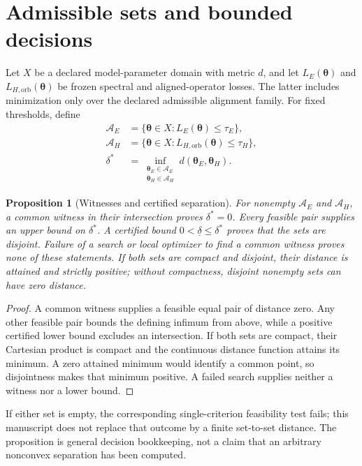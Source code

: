 \documentclass[11pt]{article}
\newtheorem{proposition}{Proposition}
\begin{document}
\section{Admissible sets and bounded decisions}\label{sec:bounded-decisions}
Let $X$ be a declared model-parameter domain with metric $d$, and let
$L_E(\boldsymbol\theta)$ and $L_{H,\mathrm{orb}}(\boldsymbol\theta)$ be frozen spectral
and aligned-operator losses. The latter includes minimization only over the declared
admissible alignment family. For fixed thresholds, define
\begin{align}
 \mathcal A_E&=\{\boldsymbol\theta\in X:L_E(\boldsymbol\theta)\le\tau_E\},\\
 \mathcal A_H&=\{\boldsymbol\theta\in X:L_{H,\mathrm{orb}}(\boldsymbol\theta)\le\tau_H\},\\
 \delta^*&=\inf_{\substack{\boldsymbol\theta_E\in\mathcal A_E\\
                           \boldsymbol\theta_H\in\mathcal A_H}}
 d(\boldsymbol\theta_E,\boldsymbol\theta_H).
 \label{eq:set-separation}
\end{align}

\begin{proposition}[Witnesses and certified separation]
\label{prop:witness-separation}
For nonempty $\mathcal A_E$ and $\mathcal A_H$, a common witness in their intersection
proves $\delta^*=0$. Every feasible pair supplies an upper bound on $\delta^*$. A
certified bound $0<\underline\delta\le\delta^*$ proves that the sets are disjoint.
Failure of a search or local optimizer to find a common witness proves none of these
statements. If both sets are compact and disjoint, their distance is attained and
strictly positive; without compactness, disjoint nonempty sets can have zero distance.
\end{proposition}

\begin{proof}
A common witness supplies a feasible equal pair of distance zero. Any other feasible
pair bounds the defining infimum from above, while a positive certified lower bound
excludes an intersection. If both sets are compact, their Cartesian product is compact
and the continuous distance function attains its minimum. A zero attained minimum would
identify a common point, so disjointness makes that minimum positive. A failed search
supplies neither a witness nor a lower bound.
\end{proof}

If either set is empty, the corresponding single-criterion feasibility test fails; this
manuscript does not replace that outcome by a finite set-to-set distance. The proposition
is general decision bookkeeping, not a claim that an arbitrary nonconvex separation has
been computed.
\end{document}
